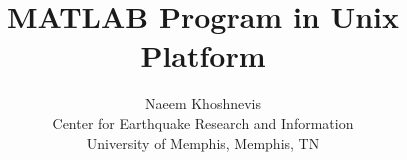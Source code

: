 \documentclass[a4paper,titlepage]{article}
\begin{document}
\title{{MATLAB\textsuperscript{\textregistered} Program in Unix Platform}}
\author{Naeem Khoshnevis\\
Center for Earthquake Research and Information \\
University of Memphis, Memphis, TN
}
\maketitle


\end{document}
